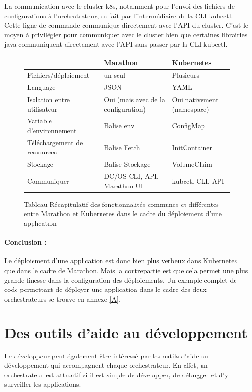 \documentclass[11pt,fleqn]{book} %
\begin{document}
La communication avec le cluster k8s, notamment pour l'envoi des fichiers de configurations à l'orchestrateur, se fait par l'intermédiaire de la CLI kubectl. Cette ligne de commande communique directement avec l'API du cluster. C'est le moyen à privilégier pour communiquer avec le cluster bien que certaines librairies java communiquent directement avec l'API sans passer par la CLI kubectl.

\begin{figure}[H]\centering
\begin{tabular}{@{}lll@{}}
\toprule
                             & Marathon       & Kubernetes      \\ \midrule
Fichiers/déploiement         & un seul         & Plusieurs       \\
Language                     & JSON           & YAML            \\
Isolation entre utilisateur & Oui (mais avec de la configuration)            & Oui nativement (namespace) \\
Variable d'environnement    & Balise env     & ConfigMap       \\
Téléchargement de ressources & Balise Fetch   & InitContainer   \\
Stockage                     & Balise Stockage & VolumeClaim     \\
Communiquer & DC/OS CLI, API, Marathon UI & kubectl CLI, API\\
\bottomrule
\end{tabular}
\caption{Tableau Récapitulatif des fonctionnalités communes et différentes entre Marathon et Kubernetes dans le cadre du déploiement d'une application}
\label{tab:my-table}
\end{figure}


\begin{interrupt}
\paragraph{Conclusion :}
Le déploiement d'une application est donc bien plus verbeux dans Kubernetes que dans le cadre de Marathon. Mais la contrepartie est que cela permet une plus grande finesse dans la configuration des déploiements. Un exemple complet de code permettant de déployer une application dans le cadre des deux orchestrateurs se trouve en annexe \ref{A}.
\end{interrupt}

\section{Des outils d'aide au développement}
Le développeur peut également être intéressé par les outils d'aide au développement qui accompagnent chaque orchestrateur. En effet, un orchestrateur est attractif si il est simple de développer, de débugger et d'y surveiller les applications.\\
\end{document}

